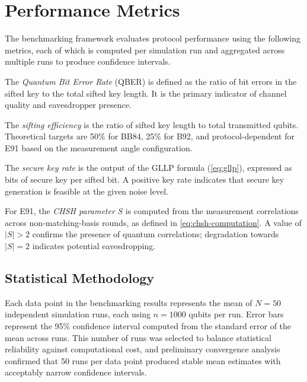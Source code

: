 
\section{Performance Metrics}

The benchmarking framework evaluates protocol performance using the following metrics, each of which is computed per simulation run and aggregated across multiple runs to produce confidence intervals.

The \textit{Quantum Bit Error Rate} (QBER) is defined as the ratio of bit errors in the sifted key to the total sifted key length. It is the primary indicator of channel quality and eavesdropper presence.

The \textit{sifting efficiency} is the ratio of sifted key length to total transmitted qubits. Theoretical targets are 50\% for BB84, 25\% for B92, and protocol-dependent for E91 based on the measurement angle configuration.

The \textit{secure key rate} is the output of the GLLP formula (\cref{eq:gllp}), expressed as bits of secure key per sifted bit. A positive key rate indicates that secure key generation is feasible at the given noise level.

For E91, the \textit{CHSH parameter} $S$ is computed from the measurement correlations across non-matching-basis rounds, as defined in \cref{eq:chsh-computation}. A value of $|S| > 2$ confirms the presence of quantum correlations; degradation towards $|S| = 2$ indicates potential eavesdropping.

\subsection{Statistical Methodology}

Each data point in the benchmarking results represents the mean of $N = 50$ independent simulation runs, each using $n = 1000$ qubits per run. Error bars represent the 95\% confidence interval computed from the standard error of the mean across runs. This number of runs was selected to balance statistical reliability against computational cost, and preliminary convergence analysis confirmed that 50 runs per data point produced stable mean estimates with acceptably narrow confidence intervals.

